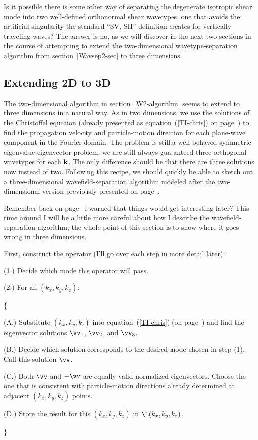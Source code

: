 Is it possible there is some other way of separating the
degenerate isotropic shear mode into two well-defined orthonormal shear
wavetypes, one that avoids the artificial singularity the standard ``SV, SH''
definition creates for vertically traveling waves?
\label{Separ3-Question}
The answer is no, as we will discover in the next two sections
in the course of attempting to extend the two-dimensional
wavetype-separation algorithm
from section~\ref{Wavsep2-sec} to three dimensions.

\subsection{Extending 2D to 3D}

The two-dimensional algorithm in section~\ref{W2-algorithm}
seems to extend to three dimensions in a natural way.
As in two dimensions,
we use the solutions of the Christoffel equation
(already presented as equation~(\ref{TI-chris})
on page~\pageref{TI-chris})
to find
the propagation velocity and particle-motion direction
for each plane-wave component in the Fourier domain.
The problem is still a well behaved symmetric eigenvalue-eigenvector
problem; we are still always guaranteed three orthogonal wavetypes
for each $\mbox{\bf k}$.
The only difference should be that there are three solutions now instead
of two.
Following this recipe, we should quickly be able to sketch out
a three-dimensional wavefield-separation algorithm
modeled after the two-dimensional version previously presented
on page~\pageref{W2-algorithm}.

Remember back on page~\pageref{TI-OminousForeboding}
I warned that things would get interesting later?
This time around I will be a little more careful about how I describe
the wavefield-separation algorithm;
the whole point of this section is to show where it goes wrong
in three dimensions.

First, construct the operator (I'll go over each step in more detail
later):
\begin{list}{}{}
\item[(1.)] Decide which mode this operator will pass.
\item[(2.)] For all $(k_x,k_y,k_z)$:
\item[] \{
\begin{list}{}{}
\item[(A.)] Substitute $(k_x, k_y, k_z)$ into equation~(\ref{TI-chris})
(on page~\pageref{TI-chris}) and find the eigenvector solutions
${\vv}_1$,
${\vv}_2$, and
${\vv}_3$.
\item[(B.)] Decide which solution corresponds to
the desired mode chosen in step (1). Call this solution $\vv$.
\item[(C.)]
Both ${\vv}$ and $-{\vv}$ are equally valid normalized eigenvectors.
Choose the one that is consistent with particle-motion
directions already determined at adjacent $(k_x,k_y,k_z)$ points.
\item[(D.)] Store the result for this $(k_x,k_y,k_z)$ in $\L(k_x,k_y,k_z)$.
\end{list}
\item[] \}
\end{list}

